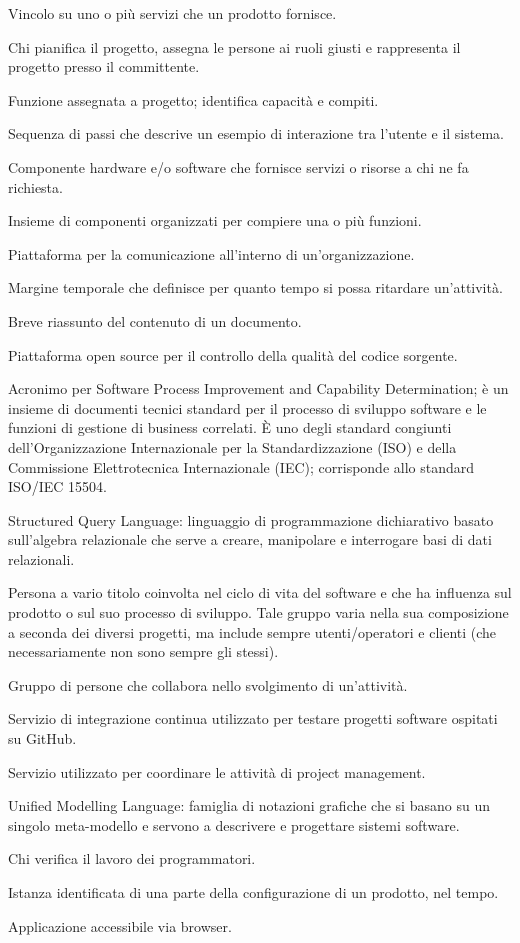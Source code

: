 \item[requisito non funzionale] Vincolo su uno o più servizi che un prodotto fornisce.
\item[responsabile di progetto] Chi pianifica il progetto, assegna le persone ai ruoli giusti e rappresenta il progetto presso il  committente.
\item[ruolo] Funzione assegnata a progetto; identifica capacità e compiti.
\item[scenario] Sequenza di passi che descrive un esempio di interazione tra l'utente e il sistema.
\item[server] Componente hardware e/o software che fornisce servizi o risorse a chi ne fa richiesta.
\item[sistema] Insieme di componenti organizzati per compiere una o più funzioni.
\item[Slack ] Piattaforma per la comunicazione all'interno di un'organizzazione.
\item[slack, periodo di] Margine temporale che definisce per quanto tempo si possa ritardare un’attività.
\item[sommario] Breve riassunto del contenuto di un documento.
\item[SonarQube] Piattaforma open source per il controllo della qualità del codice sorgente.
\item[SPICE] Acronimo per Software Process Improvement and Capability Determination; è un insieme di documenti tecnici standard per il processo di sviluppo software e le funzioni di gestione di business correlati. È uno degli standard congiunti dell’Organizzazione Internazionale per la Standardizzazione (ISO) e della Commissione Elettrotecnica Internazionale (IEC); corrisponde allo standard ISO/IEC 15504.
\item[SQL] Structured Query Language: linguaggio di programmazione dichiarativo basato sull'algebra relazionale che serve a creare, manipolare e interrogare basi di dati relazionali.
\item[stakeholder] Persona a vario titolo coinvolta nel ciclo di vita del software e che ha influenza sul prodotto o sul suo processo di sviluppo. Tale gruppo varia nella sua composizione a seconda dei diversi progetti, ma include sempre utenti/operatori e clienti (che necessariamente non sono sempre gli stessi).
\item[Team] Gruppo di persone che collabora nello svolgimento di un’attività.
\item[Travis] Servizio di integrazione continua utilizzato per testare progetti software ospitati su GitHub.
\item[Trello] Servizio utilizzato per coordinare le attività di project management.
\item[UML] Unified Modelling Language: famiglia di notazioni grafiche che si basano su un singolo meta-modello e servono a descrivere e progettare sistemi software.
\item[verificatore] Chi verifica il lavoro dei programmatori.
\item[versione] Istanza identificata di una parte della configurazione di un prodotto, nel tempo.
\item[Web Application] Applicazione accessibile via browser.
